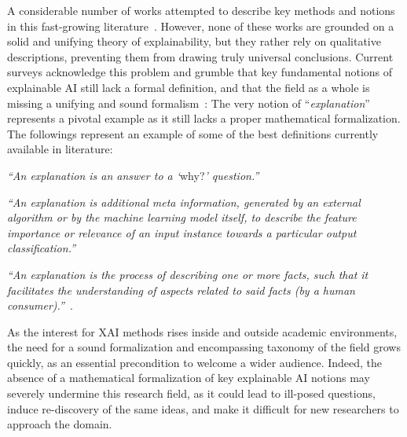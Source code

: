 A considerable number of works attempted to describe key methods and notions in this fast-growing literature~\cite{adadi2018peeking,Das2020OpportunitiesAC,arrieta2020explainable,dovsilovic2018explainable,tjoa2020survey,gunning2019xai,hoffman2018metrics,palacio2021xai}. 
However, none of these works are grounded on a solid and unifying theory of explainability, but they rather rely on qualitative descriptions, preventing them from drawing truly universal conclusions. Current surveys acknowledge this problem and grumble that key fundamental notions of explainable AI still lack a formal definition, and that the field as a whole is missing a unifying and sound formalism~\cite{adadi2018peeking,palacio2021xai}: The very notion of ``\textit{explanation}'' represents a pivotal example as it still lacks a proper mathematical formalization. The followings represent an example of some of the best definitions currently available in literature:
{\small
\begin{displayquote}
\textit{``An explanation is an answer to a `}why?\textit{' question.''~\cite{miller2019explanation}}

\textit{``An explanation is additional meta information, generated by an external algorithm or by the machine learning model itself, to describe the feature importance or relevance of an input instance towards a particular output classification.''~\cite{Das2020OpportunitiesAC}}

\textit{``An explanation is the process of describing one or
more facts, such that it facilitates the understanding of aspects related to said facts (by a human
consumer).''}~\cite{palacio2021xai}.
\end{displayquote}
}

As the interest for XAI methods rises inside and outside academic environments, the need for a sound formalization and encompassing taxonomy of the field grows quickly, as an essential precondition to welcome a wider audience. Indeed, the absence of a mathematical formalization of key explainable AI notions may severely undermine this research field, as it could lead to ill-posed questions, induce re-discovery of the same ideas, and make it difficult for new researchers to approach the domain.

